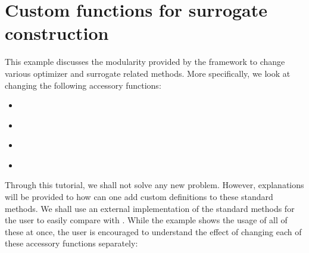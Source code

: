 \documentclass[letterpaper,12pt,english]{sphinxmanual}
\begin{document}
\section{Custom functions for surrogate construction}
\label{\detokenize{examples/user_defined_function_example:custom-functions-for-surrogate-construction}}\label{\detokenize{examples/user_defined_function_example:example-1}}\label{\detokenize{examples/user_defined_function_example::doc}}
\sphinxAtStartPar
This example discusses the modularity provided by the framework to change various optimizer and surrogate related
methods. More specifically, we look at changing the following accessory functions:
\begin{itemize}
\item {} 
\sphinxAtStartPar
{\hyperref[\detokenize{examples/user_defined_function_example:ex1-init}]{}}

\item {} 
\sphinxAtStartPar
{\hyperref[\detokenize{examples/user_defined_function_example:ex1-kernel}]{}}

\item {} 
\sphinxAtStartPar
{\hyperref[\detokenize{examples/user_defined_function_example:ex1-acq}]{}}

\item {} 
\sphinxAtStartPar
{\hyperref[\detokenize{examples/user_defined_function_example:ex1-acq-opt}]{}}

\end{itemize}

\sphinxAtStartPar
Through this tutorial, we shall not solve any new problem. However, explanations will be provided to how can one add
custom definitions to these standard methods. We shall use an external implementation of the standard methods for the
user to easily compare with {\hyperref[\detokenize{examples/getting_started_example:example-0}]{}}. While the example shows the usage of all of these at once, the user is
encouraged to understand the effect of changing each of these accessory functions separately:
\end{document}
